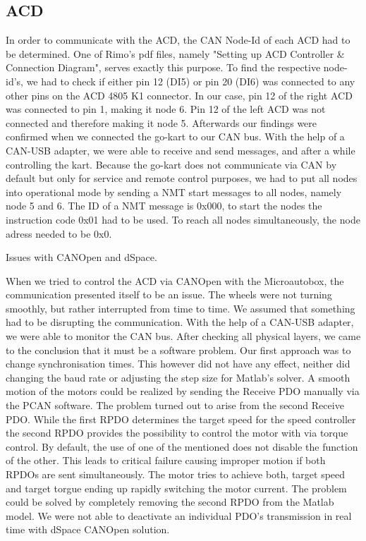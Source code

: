 \subsection{ACD}




In order to communicate with the ACD, the CAN Node-Id of each ACD had to be determined. One of Rimo's pdf files, namely "Setting up ACD Controller \& Connection Diagram", serves exactly this purpose. 
To find the respective node-id's, we had to check if either pin 12 (DI5) or pin 20 (DI6) was connected to any other pins on the ACD 4805 K1 connector. In our case, pin 12 of the right ACD was connected to pin 1, making it node 6. Pin 12 of the left ACD was not connected and therefore making it node 5. Afterwards our findings were confirmed when we connected the go-kart to our CAN bus. With the help of a CAN-USB adapter, we were able to receive and send messages, and after a while controlling the kart.
Because the go-kart does not communicate via CAN by default but only for service and remote control purposes, we had to put all nodes into operational mode by sending a NMT start messages to all nodes, namely node 5 and 6.
The ID of a NMT message is 0x000, to start the nodes the instruction code 0x01 had to be used. To reach all nodes simultaneously, the node adress needed to be 0x0. 

Issues with CANOpen and dSpace. 

When we tried to control the ACD via CANOpen with the Microautobox, the communication presented itself to be an issue. The wheels were not turning smoothly, but rather interrupted from time to time. We assumed that something had to be disrupting the communication.
With the help of a CAN-USB adapter, we were able to monitor the CAN bus. After checking all physical layers, we came to the conclusion that it must be a software problem. Our first approach was to change synchronisation times. This however did not have any effect, neither did changing the baud rate or adjusting the step size for Matlab's solver.
A smooth motion of the motors could be realized by sending the Receive PDO manually via the PCAN software. The problem turned out to arise from the second Receive PDO. While the first RPDO determines the target speed for the speed controller the second RPDO provides the possibility to control the motor with via torque control. By default, the use of one of the mentioned does not disable the function of the other. This leads to critical failure causing improper motion if both RPDOs are sent simultaneously. The motor tries to achieve both, target speed and target torgue ending up rapidly switching the motor current. The problem could be solved by completely removing the second RPDO from the Matlab model. We were not able to deactivate an individual PDO's transmission in real time with dSpace CANOpen solution.



